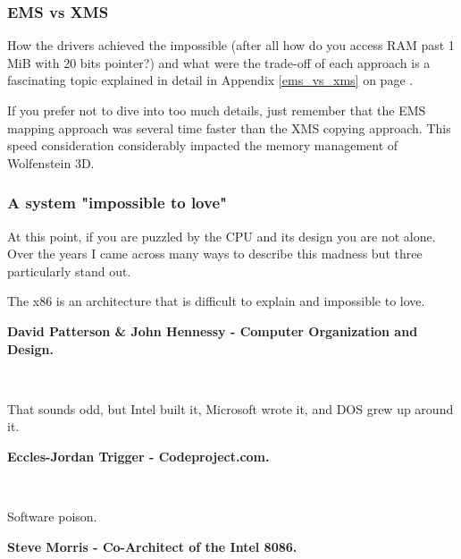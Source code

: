 \documentclass[book.tex]{subfiles}
\begin{document}
\subsubsection{EMS vs XMS}
How the drivers achieved the impossible (after all how do you access RAM past 1 MiB with 20 bits pointer?) and what were the trade-off of each approach is a fascinating topic explained in detail in Appendix \ref{ems_vs_xms} on page \pageref{ems_vs_xms}.\\
\par
 If you prefer not to dive into too much details, just remember that the EMS mapping approach was several time faster than the XMS copying approach. This speed consideration considerably impacted the memory management of Wolfenstein 3D.




\subsubsection{A system "impossible to love"}
At this point, if you are puzzled by the CPU and its design you are not alone. Over the years I came across many ways to describe this madness but three particularly stand out.\\

\par
 \begin{fancyquotes}
   The x86 is an architecture that is difficult to explain and impossible to love.\\
   \par
\textbf{David Patterson \& John Hennessy - Computer Organization and Design.}
 \end{fancyquotes}\\

\par

\par
 \begin{fancyquotes}
    That sounds odd, but Intel built it, Microsoft wrote it, and DOS grew up around it.\\
   \par
\textbf{Eccles-Jordan Trigger - Codeproject.com.}
 \end{fancyquotes}\\
\par
 \begin{fancyquotes}
    Software poison.\\
   \par
\textbf{Steve Morris - Co-Architect of the Intel 8086.}
 \end{fancyquotes}\\
\end{document}
